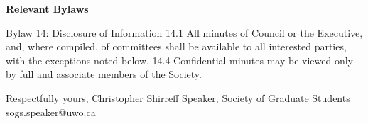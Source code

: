 \begin{longenum}[ label*=\arabic*., align=left]
\item \textbf{Relevant Bylaws}

Bylaw 14: Disclosure of Information
14.1 All minutes of Council or the Executive, and,  where compiled,  of committees shall be available to all interested parties, with the exceptions noted below.
14.4 Confidential minutes may be viewed only by full and associate members of the Society.

\end{longenum}



\noindent
Respectfully yours, \newline
\noindent
Christopher Shirreff \newline
\indent
Speaker, \newline 
\indent
Society of Graduate Students \newline
\indent
sogs.speaker@uwo.ca \newline

